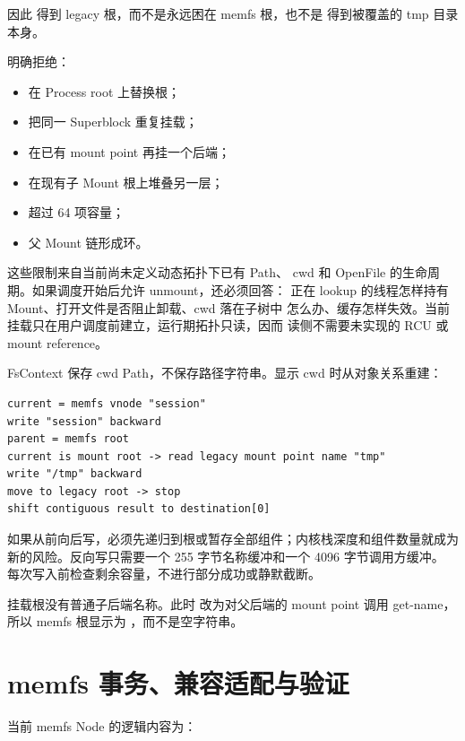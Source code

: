 因此  得到 legacy 根，而不是永远困在 memfs 根，也不是
得到被覆盖的 tmp 目录本身。

 明确拒绝：

\begin{itemize}
  \item 在 Process root 上替换根；
  \item 把同一 Superblock 重复挂载；
  \item 在已有 mount point 再挂一个后端；
  \item 在现有子 Mount 根上堆叠另一层；
  \item 超过 64 项容量；
  \item 父 Mount 链形成环。
\end{itemize}

这些限制来自当前尚未定义动态拓扑下已有 Path、
cwd 和 OpenFile 的生命周期。如果调度开始后允许 unmount，还必须回答：
正在 lookup 的线程怎样持有 Mount、打开文件是否阻止卸载、cwd 落在子树中
怎么办、缓存怎样失效。当前挂载只在用户调度前建立，运行期拓扑只读，因而
读侧不需要未实现的 RCU 或 mount reference。

FsContext 保存 cwd Path，不保存路径字符串。显示 cwd 时从对象关系重建：

\begin{lstlisting}[caption={从 /tmp/session 反向取得路径}]
current = memfs vnode "session"
write "session" backward
parent = memfs root
current is mount root -> read legacy mount point name "tmp"
write "/tmp" backward
move to legacy root -> stop
shift contiguous result to destination[0]
\end{lstlisting}

如果从前向后写，必须先递归到根或暂存全部组件；内核栈深度和组件数量就成为
新的风险。反向写只需要一个 255 字节名称缓冲和一个 4096 字节调用方缓冲。
每次写入前检查剩余容量，不进行部分成功或静默截断。

挂载根没有普通子后端名称。此时  改为对父后端的 mount
point 调用 get-name，所以 memfs 根显示为 ，而不是空字符串。

\section{memfs 事务、兼容适配与验证}

当前 memfs Node 的逻辑内容为：

